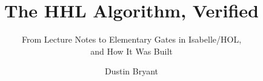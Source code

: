 \documentclass[runningheads]{llncs}
\begin{document}
\title{The HHL Algorithm, Verified}
\subtitle{From Lecture Notes to Elementary Gates in Isabelle/HOL,\\ and How It Was Built}
\author{Dustin Bryant}
\maketitle















\appendix

\end{document}
